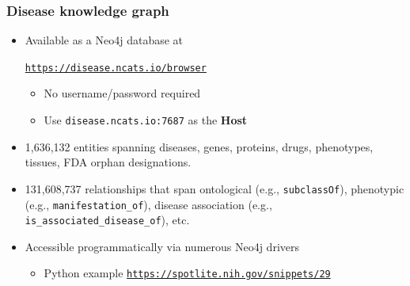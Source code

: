﻿\documentclass[anchorcolor=blue,linkcolor=blue]{beamer}
\begin{document}
\begin{frame}
  \frametitle{Disease knowledge graph}
  \begin{itemize}
  \item Available as a Neo4j database at
    
    \centerline{\href{https://disease.ncats.io/browser}{\texttt{https://disease.ncats.io/browser}}}
    \begin{itemize}
    \item No username/password required
    \item Use \texttt{disease.ncats.io:7687} as the \textbf{Host}
    \end{itemize}
  \item 1,636,132 entities spanning diseases, genes, proteins, drugs,
    phenotypes, tissues, FDA orphan designations.
  \item 131,608,737 relationships that span ontological (e.g.,
    \texttt{subclassOf}), phenotypic (e.g.,
    \texttt{manifestation\_of}), disease association (e.g.,
    \texttt{is\_associated\_disease\_of}), etc.
  \item Accessible programmatically via numerous Neo4j drivers
    \begin{itemize}
      \item Python example \href{https://spotlite.nih.gov/snippets/29}{\texttt{https://spotlite.nih.gov/snippets/29}}
    \end{itemize}
  \end{itemize}
\end{frame}
\end{document}
